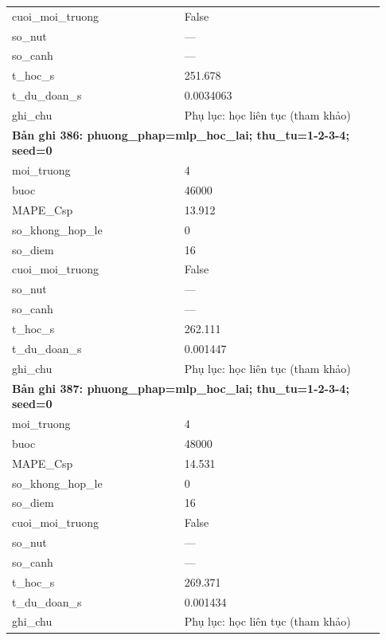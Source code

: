 \begin{longtable}{p{0.43\linewidth}p{0.50\linewidth}}
cuoi\_\allowbreak moi\_\allowbreak truong & False \\
so\_\allowbreak nut & — \\
so\_\allowbreak canh & — \\
t\_\allowbreak hoc\_\allowbreak s & 251.678 \\
t\_\allowbreak du\_\allowbreak doan\_\allowbreak s & 0.0034063 \\
ghi\_\allowbreak chu & Phụ lục: học liên tục (tham khảo) \\
\midrule
\multicolumn{2}{p{0.95\linewidth}}{\textbf{Bản ghi 386: phuong\_phap=mlp\_hoc\_lai; thu\_tu=1-2-3-4; seed=0}} \\
moi\_\allowbreak truong & 4 \\
buoc & 46000 \\
MAPE\_\allowbreak Csp & 13.912 \\
so\_\allowbreak khong\_\allowbreak hop\_\allowbreak le & 0 \\
so\_\allowbreak diem & 16 \\
cuoi\_\allowbreak moi\_\allowbreak truong & False \\
so\_\allowbreak nut & — \\
so\_\allowbreak canh & — \\
t\_\allowbreak hoc\_\allowbreak s & 262.111 \\
t\_\allowbreak du\_\allowbreak doan\_\allowbreak s & 0.001447 \\
ghi\_\allowbreak chu & Phụ lục: học liên tục (tham khảo) \\
\midrule
\multicolumn{2}{p{0.95\linewidth}}{\textbf{Bản ghi 387: phuong\_phap=mlp\_hoc\_lai; thu\_tu=1-2-3-4; seed=0}} \\
moi\_\allowbreak truong & 4 \\
buoc & 48000 \\
MAPE\_\allowbreak Csp & 14.531 \\
so\_\allowbreak khong\_\allowbreak hop\_\allowbreak le & 0 \\
so\_\allowbreak diem & 16 \\
cuoi\_\allowbreak moi\_\allowbreak truong & False \\
so\_\allowbreak nut & — \\
so\_\allowbreak canh & — \\
t\_\allowbreak hoc\_\allowbreak s & 269.371 \\
t\_\allowbreak du\_\allowbreak doan\_\allowbreak s & 0.001434 \\
ghi\_\allowbreak chu & Phụ lục: học liên tục (tham khảo) \\

\end{longtable}

